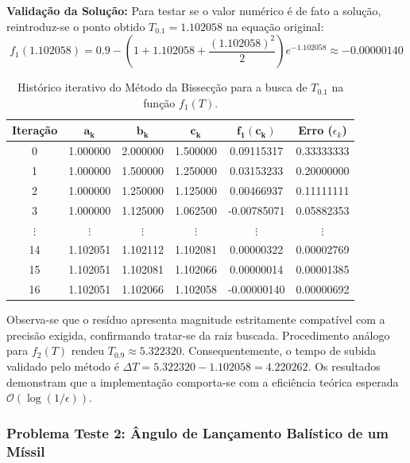 \textbf{Validação da Solução:} Para testar se o valor numérico é de fato a solução, reintroduz-se o ponto obtido $T_{0.1} = 1.102058$ na equação original:
\begin{equation}
    f_1(1.102058) = 0.9 - \left(1 + 1.102058 + \frac{(1.102058)^2}{2}\right)e^{-1.102058} \approx -0.00000140
\end{equation}

\begin{table}[htpb]
\centering
\caption{Histórico iterativo do Método da Bissecção para a busca de $T_{0.1}$ na função $f_1(T)$.}
\label{tab:bisseccao_f1}
\small
\begin{tabular}{@{}cccccc@{}}
\toprule
\textbf{Iteração} & $\mathbf{a_k}$ & $\mathbf{b_k}$ & $\mathbf{c_k}$ & $\mathbf{f_1(c_k)}$ & \textbf{Erro} ($\epsilon_k$) \\ \midrule
0  & 1.000000 & 2.000000 & 1.500000 & \phantom{-}0.09115317 & 0.33333333 \\
1  & 1.000000 & 1.500000 & 1.250000 & \phantom{-}0.03153233 & 0.20000000 \\
2  & 1.000000 & 1.250000 & 1.125000 & \phantom{-}0.00466937 & 0.11111111 \\
3  & 1.000000 & 1.125000 & 1.062500 & -0.00785071           & 0.05882353 \\
$\vdots$ & $\vdots$ & $\vdots$ & $\vdots$ & $\vdots$          & $\vdots$   \\
14 & 1.102051 & 1.102112 & 1.102081 & \phantom{-}0.00000322 & 0.00002769 \\
15 & 1.102051 & 1.102081 & 1.102066 & \phantom{-}0.00000014 & 0.00001385 \\
16 & 1.102051 & 1.102066 & 1.102058 & -0.00000140           & 0.00000692 \\ \bottomrule
\end{tabular}
\end{table}

Observa-se que o resíduo apresenta magnitude estritamente compatível com a precisão exigida, confirmando tratar-se da raiz buscada. Procedimento análogo para $f_2(T)$ rendeu $T_{0.9} \approx 5.322320$. Consequentemente, o tempo de subida validado pelo método é $\Delta T = 5.322320 - 1.102058 = 4.220262$. Os resultados demonstram que a implementação comporta-se com a eficiência teórica esperada $\mathcal{O}(\log(1/\epsilon))$.

\subsubsection{Problema Teste 2: Ângulo de Lançamento Balístico de um Míssil}
\label{subsubsec:problema_teste_2_bisseccao}

